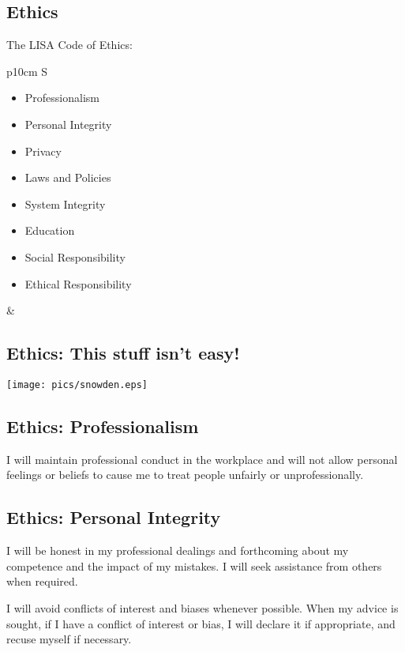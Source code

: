 \documentclass[xga]{xdvislides}
\begin{document}
\subsection{Ethics}
The LISA Code of Ethics:
\\

\begin{tabular}{ p{10cm} S }
\begin{itemize}
	\item Professionalism
	\item Personal Integrity
	\item Privacy
	\item Laws and Policies
	\item System Integrity
	\item Education
	\item Social Responsibility
	\item Ethical Responsibility
\end{itemize}
&  \\
\end{tabular}

\subsection{Ethics: This stuff isn't easy!}
\begin{center}
	\texttt{[image: pics/snowden.eps]}
\end{center}

\subsection{Ethics: Professionalism}
\vfill
\begin{center}
I will maintain professional conduct in the workplace and will not allow
personal feelings or beliefs to cause me to treat people unfairly or
unprofessionally.
\end{center}
\vfill

\subsection{Ethics: Personal Integrity}
\vfill
\begin{center}
I will be honest in my professional dealings and forthcoming about my
competence and the impact of my mistakes. I will seek assistance from
others when required. \\
\vspace{.5in}

I will avoid conflicts of interest and biases whenever possible. When my
advice is sought, if I have a conflict of interest or bias, I will declare
it if appropriate, and recuse myself if necessary.
\end{center}
\vfill
\end{document}
